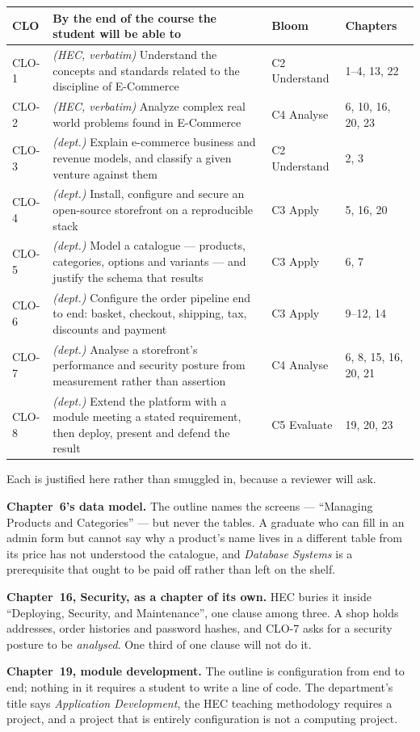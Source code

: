 \begin{longtable}{@{}L{1.3cm}L{7.6cm}L{2.1cm}L{3.8cm}@{}}
\toprule
{}
\textbf{CLO} & \textbf{By the end of the course the student will be able to} &
\textbf{Bloom} & \textbf{Chapters} \\
\midrule
\endhead
CLO-1 & \emph{(HEC, verbatim)} Understand the concepts and standards related to
the discipline of E-Commerce & C2 Understand & 1--4, 13, 22 \\
CLO-2 & \emph{(HEC, verbatim)} Analyze complex real world problems found in
E-Commerce & C4 Analyse & 6, 10, 16, 20, 23 \\
CLO-3 & \emph{(dept.)} Explain e-commerce business and revenue models, and
classify a given venture against them & C2 Understand & 2, 3 \\
CLO-4 & \emph{(dept.)} Install, configure and secure an open-source storefront
on a reproducible stack & C3 Apply & 5, 16, 20 \\
CLO-5 & \emph{(dept.)} Model a catalogue --- products, categories, options and
variants --- and justify the schema that results & C3 Apply & 6, 7 \\
CLO-6 & \emph{(dept.)} Configure the order pipeline end to end: basket,
checkout, shipping, tax, discounts and payment & C3 Apply & 9--12, 14 \\
CLO-7 & \emph{(dept.)} Analyse a storefront's performance and security posture
from measurement rather than assertion & C4 Analyse & 6, 8, 15, 16, 20, 21 \\
CLO-8 & \emph{(dept.)} Extend the platform with a module meeting a stated
requirement, then deploy, present and defend the result & C5 Evaluate &
19, 20, 23 \\
\bottomrule
\end{longtable}

\begin{conceptbox}
Each is justified here rather than smuggled in, because a reviewer will ask.

\smallskip
\textbf{Chapter~6's data model.} The outline names the screens --- ``Managing
Products and Categories'' --- but never the tables. A graduate who can fill in
an admin form but cannot say why a product's name lives in a different table
from its price has not understood the catalogue, and \emph{Database Systems} is
a prerequisite that ought to be paid off rather than left on the shelf.

\smallskip
\textbf{Chapter~16, Security, as a chapter of its own.} HEC buries it inside
``Deploying, Security, and Maintenance'', one clause among three. A shop holds
addresses, order histories and password hashes, and CLO-7 asks for a security
posture to be \emph{analysed}. One third of one clause will not do it.

\smallskip
\textbf{Chapter~19, module development.} The outline is configuration from end
to end; nothing in it requires a student to write a line of code. The
department's title says \emph{Application Development}, the HEC teaching
methodology requires a project, and a project that is entirely configuration is
not a computing project.
\end{conceptbox}

